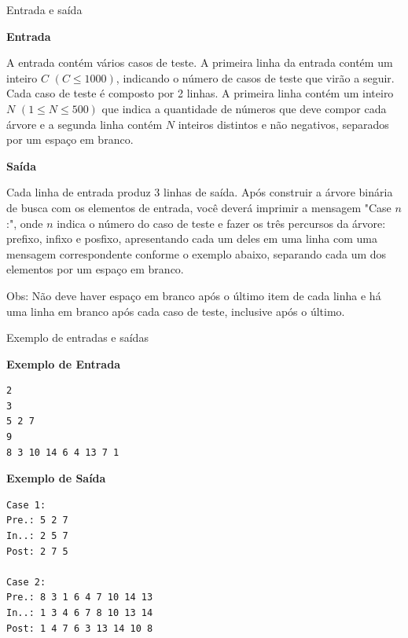 \begin{frame}[fragile]{Entrada e saída}

\textbf{Entrada}

A entrada contém vários casos de teste. A primeira linha da entrada contém um inteiro $C$ $(C \leq 1000)$, indicando o número de casos de teste que virão a seguir. Cada caso de teste é composto por 2 linhas. A primeira linha contém um inteiro $N$ $(1 \leq N \leq 500)$ que indica a quantidade de números que deve compor cada árvore e a segunda linha contém $N$ inteiros distintos e não negativos, separados por um espaço em branco.

\textbf{Saída}

Cada linha de entrada produz 3 linhas de saída. Após construir a árvore binária de busca com os elementos de entrada, você deverá imprimir a mensagem "Case $n$:", onde $n$ indica o número do caso de teste e fazer os três percursos da árvore: prefixo, infixo e posfixo, apresentando cada um deles em uma linha com uma mensagem correspondente conforme o exemplo abaixo, separando cada um dos elementos por um espaço em branco. 

Obs: Não deve haver espaço em branco após o último item de cada linha e há uma linha em branco após cada caso de teste, inclusive após o último.

\end{frame}

\begin{frame}[fragile]{Exemplo de entradas e saídas}

\begin{minipage}[t]{0.5\textwidth}
\textbf{Exemplo de Entrada}
\begin{verbatim}
2
3
5 2 7
9
8 3 10 14 6 4 13 7 1
\end{verbatim}
\end{minipage}
\begin{minipage}[t]{0.45\textwidth}
\textbf{Exemplo de Saída}
\begin{verbatim}
Case 1:
Pre.: 5 2 7
In..: 2 5 7
Post: 2 7 5

Case 2:
Pre.: 8 3 1 6 4 7 10 14 13
In..: 1 3 4 6 7 8 10 13 14
Post: 1 4 7 6 3 13 14 10 8
\end{verbatim}
\end{minipage}
\end{frame}


